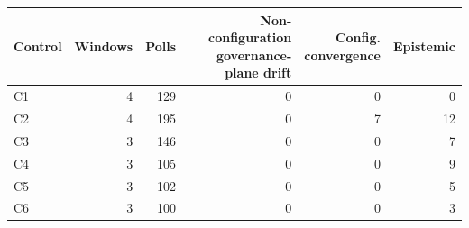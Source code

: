 \begin{tabular}{@{}lrrrrr@{}}
\toprule
Control & Windows & Polls & \shortstack{Non-configuration\\governance-plane drift} & \shortstack{Config.\\convergence} & Epistemic \\
\midrule
C1 & 4 & 129 & 0 & 0 & 0 \\
C2 & 4 & 195 & 0 & 7 & 12 \\
C3 & 3 & 146 & 0 & 0 & 7 \\
C4 & 3 & 105 & 0 & 0 & 9 \\
C5 & 3 & 102 & 0 & 0 & 5 \\
C6 & 3 & 100 & 0 & 0 & 3 \\
\bottomrule
\end{tabular}
